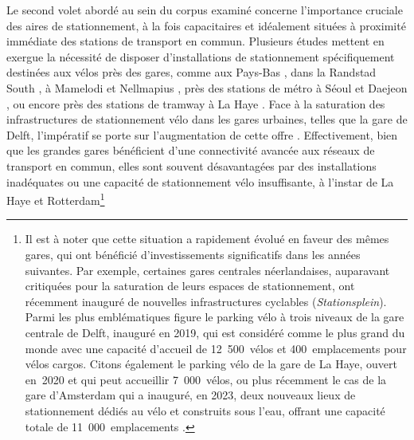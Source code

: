 \begin{refsegment}
Le second volet abordé au sein du corpus examiné concerne l'importance cruciale des aires de stationnement, à la fois capacitaires et idéalement situées à proximité immédiate des stations de transport en commun. Plusieurs études mettent en exergue la nécessité de disposer d'installations de stationnement spécifiquement destinées aux vélos près des gares, comme aux Pays-Bas \textcolor{blue}{\autocite[75]{rietveld_accessibility_2000}}, dans la Randstad South \textcolor{blue}{\autocite[11]{geurs_multi-modal_2016}}, à Mamelodi et Nellmapius \textcolor{blue}{\autocite[40]{bechstein_cycling_2010}}, près des stations de métro à Séoul et Daejeon \textcolor{blue}{\autocites[53]{lee_strategies_2010}[982]{lee_bicycle-based_2016}}, ou encore près des stations de tramway à La Haye \textcolor{blue}{\autocite[833]{ton_understanding_2020}}. Face à la saturation des infrastructures de stationnement vélo dans les gares urbaines, telles que la gare de Delft, l'impératif se porte sur l'augmentation de cette offre \textcolor{blue}{\autocite[9-10]{molin_bicycle_2015}}. Effectivement, bien que les grandes gares bénéficient d'une connectivité avancée aux réseaux de transport en commun, elles sont souvent désavantagées par des installations inadéquates ou une capacité de stationnement vélo insuffisante, à l'instar de La Haye et Rotterdam\footnote{
    Il est à noter que cette situation a rapidement évolué en faveur des mêmes gares, qui ont bénéficié d'investissements significatifs dans les années suivantes. Par exemple, certaines gares centrales néerlandaises, auparavant critiquées pour la saturation de leurs espaces de stationnement, ont récemment inauguré de nouvelles infrastructures cyclables (\textsl{Stationsplein}). Parmi les plus emblématiques figure le parking vélo à trois niveaux de la gare centrale de Delft, inauguré en 2019, qui est considéré comme le plus grand du monde avec une capacité d'accueil de 12~500~vélos et 400~emplacements pour vélos cargos. Citons également le parking vélo de la gare de La Haye, ouvert en~2020 et qui peut accueillir 7~000~vélos, ou plus récemment le cas de la gare d'Amsterdam qui a inauguré, en 2023, deux nouveaux lieux de stationnement dédiés au vélo et construits sous l'eau, offrant une capacité totale de 11~000~emplacements \textcolor{blue}{\autocite[]{bicycle_dutch_underground_2023}}.
}
\end{refsegment}
